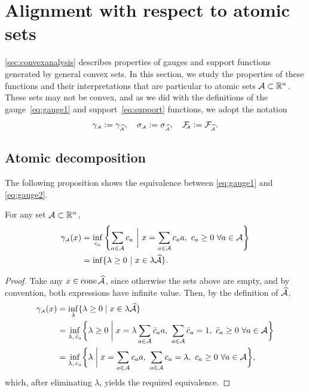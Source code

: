 \section{Alignment with respect to atomic sets} \label{sec:convexanalysis-atomic}

\autoref{sec:convexanalysis} describes properties of gauges and support functions
generated by general convex sets. In this section, we study the properties of
these functions and their interpretations that are particular to atomic sets
$\mathcal{A}\subset\mathbb{R}^n$. These sets may not be convex, and as we did with the
definitions of the gauge~\eqref{eq:gauge1} and support~\eqref{eq:support}
functions, we adopt the notation
\[
  \gamma_{\scriptscriptstyle\mathcal{A}}:=\gamma_{\scriptscriptstyle\widehat{\mathcal{A}}},
  \quad \sigma_{\scriptscriptstyle\mathcal{A}}:=\sigma_{\scriptscriptstyle\widehat{\mathcal{A}}},
  \quad \mathcal{F}_{\!\!\scriptscriptstyle\mathcal{A}}:=\mathcal{F}_{\scriptscriptstyle\widehat{\mathcal{A}}}.
\]


\subsection{Atomic decomposition}

The following proposition shows the equivalence between \eqref{eq:gauge1} and \eqref{eq:gauge2}. 

  \begin{proposition}
    \label{prop-guage-equivalence}
    For any set $\mathcal{A}\subset\mathbb{R}^n$,
    \begin{equation*}
      \begin{aligned}
      \gamma_{\scriptscriptstyle\mathcal{A}}(x)
      &=\inf_{c_a} \left\{ \sum_{a\in\mathcal{A}}c_a ~\bigg\vert~ x = \sum_{a\in\mathcal{A}}c_aa,\ c_a \ge0\ \forall a\in\mathcal{A} \right\}
    \\&=\inf\{\lambda\ge0~|~x\in\lambda\widehat{\mathcal{A}}\}.
      \end{aligned}
    \end{equation*}
  \end{proposition}
  \begin{proof}
    Take any $x\in\operatorname{cone}\widehat{\mathcal{A}}$, since otherwise the sets above are
    empty, and by convention, both expressions have infinite
    value. Then, by the definition of $\widehat{\mathcal{A}}$,
    \begin{align*}
      \gamma_{\scriptscriptstyle\mathcal{A}}(x)
      &= \inf_\lambda\{\lambda\ge0 \mid x\in\lambda\widehat{\mathcal{A}}\}
    \\&= \inf_{\lambda,\,\bar c_a}\biggl\{\lambda\ge0 \biggm| x = \lambda\sum_{a\in\mathcal{A}}\bar c_aa,\ \sum_{a\in\mathcal{A}}\bar c_a=1,\ \bar c_a\ge0\ \forall a\in\mathcal{A}\biggr\}
    \\&=  \inf_{\lambda,\,c_a}\biggl\{\lambda \biggm| x = \sum_{a\in\mathcal{A}}c_aa,\ \sum_{a\in\mathcal{A}}c_a=\lambda,\ c_a\ge0\ \forall a\in\mathcal{A}\biggr\},
    \end{align*}
    which, after eliminating $\lambda$, yields the required equivalence.
  \end{proof}

